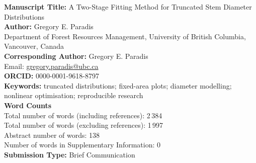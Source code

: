 \documentclass[12pt]{article}
\begin{document}
\thispagestyle{empty}
\doublespacing

\textbf{Manuscript Title:} A Two-Stage Fitting Method for Truncated Stem Diameter Distributions\\[1ex]
\textbf{Author:} Gregory E. Paradis\\
Department of Forest Resources Management, University of British Columbia, Vancouver, Canada\\[1ex]
\textbf{Corresponding Author:} Gregory E. Paradis\\
Email: \href{mailto:gregory.paradis@ubc.ca}{gregory.paradis@ubc.ca}\\[1ex]
\textbf{ORCID:} 0000-0001-9618-8797\\[1ex]
\textbf{Keywords:} truncated distributions; fixed-area plots; diameter modelling; nonlinear optimisation; reproducible research\\[1ex]
\textbf{Word Counts}\\
Total number of words (including references): 2\,384\\
Total number of words (excluding references): 1\,997\\
Abstract number of words: 138\\
Number of words in Supplementary Information: 0\\[1ex]
\textbf{Submission Type:} Brief Communication\\
\end{document}
